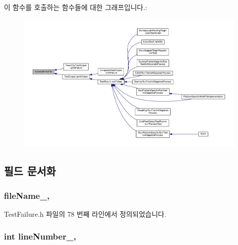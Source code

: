 이 함수를 호출하는 함수들에 대한 그래프입니다.\+:
\nopagebreak
\begin{figure}[H]
\begin{center}
\leavevmode
\includegraphics[width=350pt]{class_test_failure_a977b24b749f7dc0d279fed902991c7b4_icgraph}
\end{center}
\end{figure}




\subsection{필드 문서화}
\subsubsection[{\texorpdfstring{file\+Name\+\_\+}{fileName_}}]{ file\+Name\+\_\+\hspace{0.3cm}{\ttfamily [protected]}, {\ttfamily [inherited]}}\hypertarget{class_test_failure_a58b6159b0aa3b9775be67920baef742c}{}\label{class_test_failure_a58b6159b0aa3b9775be67920baef742c}


Test\+Failure.\+h 파일의 78 번째 라인에서 정의되었습니다.

\subsubsection[{\texorpdfstring{line\+Number\+\_\+}{lineNumber_}}]{\setlength{\rightskip}{0pt plus 5cm}int line\+Number\+\_\+\hspace{0.3cm}{\ttfamily [protected]}, {\ttfamily [inherited]}}\hypertarget{class_test_failure_ab83f5a7389dae9b8045aa6fbf55b153a}{}\label{class_test_failure_ab83f5a7389dae9b8045aa6fbf55b153a}


